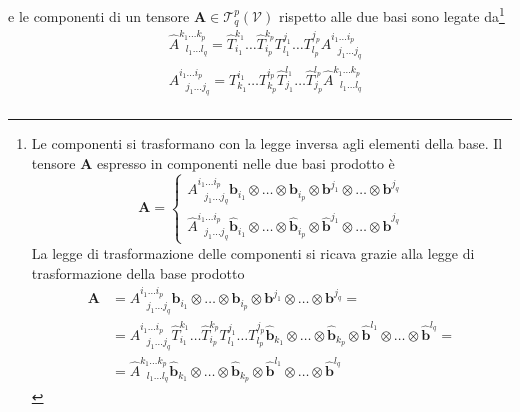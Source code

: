  e le componenti di un tensore $\bm{A} \in \mathcal{T}^p_q(\mathcal{V})$ rispetto alle due basi sono legate da\footnote{
 Le componenti si trasformano con la legge inversa agli elementi della base. Il tensore $\bm{A}$ espresso in componenti nelle due
 basi prodotto è
 \begin{equation}
 \bm{A} = 
 \begin{cases}
   A^{i_1 \dots i_p}_{\ \ \ j_1 \dots j_q} \bm{b}_{i_1} \otimes \dots \otimes \bm{b}_{i_p} \otimes
     \bm{b}^{j_1} \otimes \dots \otimes \bm{b}^{j_q} \\
  \hat{A}^{i_1 \dots i_p}_{\ \ \ j_1 \dots j_q} \bm{\hat{b}}_{i_1} \otimes \dots \otimes \bm{\hat{b}}_{i_p} \otimes
     \bm{\hat{b}}^{j_1} \otimes \dots \otimes \bm{\hat{b}}^{j_q}
 \end{cases}
 \end{equation}
 La legge di trasformazione delle componenti si ricava grazie alla legge di trasformazione della base prodotto
 \begin{equation}
 \begin{aligned}
  \bm{A} & =  A^{i_1 \dots i_p}_{\ \ \ j_1 \dots j_q} \bm{b}_{i_1} \otimes \dots \otimes \bm{b}_{i_p} \otimes
     \bm{b}^{j_1} \otimes \dots \otimes \bm{b}^{j_q} = \\
   & = A^{i_1 \dots i_p}_{\ \ \ j_1 \dots j_q} 
     \hat{T}^{k_1}_{i_1}\dots \hat{T}^{k_p}_{i_p} T ^{j_1}_{l_1}\dots T^{j_p}_{l_p}
     \bm{\hat{b}}_{k_1} \otimes \dots \otimes \bm{\hat{b}}_{k_p} \otimes
     \bm{\hat{b}}^{l_1} \otimes \dots \otimes \bm{\hat{b}}^{l_q}= \\ 
   & = \hat{A}^{k_1 \dots k_p}_{\ \ \ l_1 \dots l_q} \bm{\hat{b}}_{k_1} \otimes \dots \otimes \bm{\hat{b}}_{k_p} \otimes
     \bm{\hat{b}}^{l_1} \otimes \dots \otimes \bm{\hat{b}}^{l_q}
 \end{aligned}
 \end{equation}
 }
\begin{equation}
\begin{aligned}
 &  \hat{A}^{k_1 \dots k_p}_{\ \ \ l_1 \dots l_q} = 
  \hat{T}^{k_1}_{i_1}\dots \hat{T}^{k_p}_{i_p} T^{j_1}_{l_1} \dots T^{j_p}_{l_p}
  A^{i_1 \dots i_p}_{\ \ \ j_1 \dots j_q} \\
 &  A^{i_1 \dots i_p}_{\ \ \ j_1 \dots j_q} = 
  T^{i_1}_{k_1}\dots T^{i_p}_{k_p} \hat{T}^{l_1}_{j_1} \dots \hat{T}^{l_p}_{j_p}
  \hat{A}^{k_1 \dots k_p}_{\ \ \ l_1 \dots l_q} \\
\end{aligned}
\end{equation}
 


